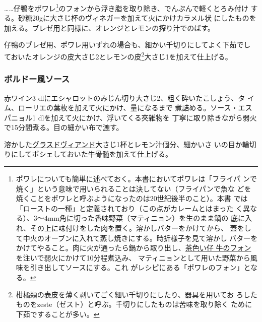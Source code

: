 \begin{recette}
\ldots{}\ldots{}仔鴨をポワレ\footnote{ポワレについても簡単に述べておく。本書においてポワレは「フライパ
  ンで焼く」という意味で用いられることは決してない（フライパンで魚な
  どを焼くことをポワレと呼ぶようになったのは20世紀後半のこと）。本書
  では「ローストの一種」と定義されており（この点がカレームとはまった
  く異なる）、3〜4mm角に切った香味野菜（マティニョン）を生のまま鍋の
  底に入れ、その上に味付けをした肉を置く。溶かしバターをかけてから、
  蓋をして中火のオーブンに入れて蒸し焼きにする。時折様子を見て溶かし
  バターをかけてやること。肉に火が通ったら鍋から取り出し、\protect\hyperlink{jus-de-veau-brun}{茶色い仔
  牛のフォン}を注いで弱火にかけて10分程煮込み、
  マティニョンとして用いた野菜から風味を引き出してソースにする。これ
  がレシピにある「ポワレのフォン」となる。}のフォンから浮き脂を取り除き、でんぷんで軽くとろみ付け
する。砂糖20gに大さじ\undemi{}杯のヴィネガーを加えて火にかけカラメル状
にしたものを加える。ブレゼ用と同様に、オレンジとレモンの搾り汁でのばす。

仔鴨のブレゼ用、ポワレ用いずれの場合も、細かい千切りにしてよく下茹でし
ておいたオレンジの皮大さじ2とレモンの皮\footnote{柑橘類の表皮を薄く剥いてごく細い千切りにしたり、器具を用いてお
  ろしたものをzeste（ゼスト）と呼ぶ。千切りにしたものは苦味を取り除く
  ために下茹ですることが多い。}大さじ1を加えて仕上げる。

\hypertarget{sauce-bordelaise}{%
\subsubsection{ボルドー風ソース}\label{sauce-bordelaise}}



赤ワイン3 dlにエシャロットのみじん切り大さじ2、粗く砕いたこしょう、タ
イム、ローリエの葉\undemi{}枚を加えて火にかけ、\unquart{}量になるまで
煮詰める。ソース・エスパニョル1 dlを加えて火にかけ、浮いてくる夾雑物を
丁寧に取り除きながら弱火で15分間煮る。目の細かい布で漉す。

溶かした\protect\hyperlink{glace-de-viande}{グラスドヴィアンド}大さじ1杯とレモン汁\unquart{}個分、細かいさ
いの目か輪切りにしてポシェしておいた牛骨髄を加えて仕上げる。


\end{recette}
